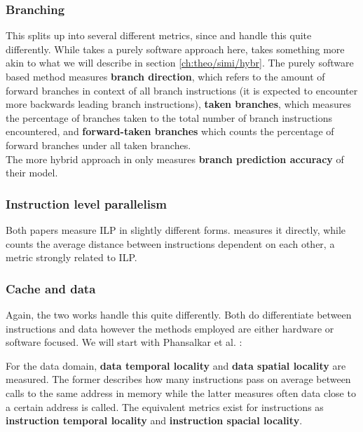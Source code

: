 \documentclass[../bachelor_paper.tex]{subfiles}
\begin{document}
\subsubsection{Branching} 
This splits up into several different metrics, since \cite{phansalkarMeasuringProgramSimilarity2005} and \cite{eeckhoutDesigningComputerArchitecture2003} handle this quite differently. While \cite{phansalkarMeasuringProgramSimilarity2005} takes a purely software approach here, \cite{eeckhoutDesigningComputerArchitecture2003} takes something more akin to what we will describe in section \ref{ch:theo/simi/hybr}. The purely software based method measures \textbf{branch direction}, which refers to the amount of forward branches in context of all branch instructions (it is expected to encounter more backwards leading branch instructions), \textbf{taken branches}, which measures the percentage of branches taken to the total number of branch instructions encountered, and \textbf{forward-taken branches} which counts the percentage of forward branches under all taken branches.\\
The more hybrid approach in \cite{eeckhoutDesigningComputerArchitecture2003} only measures \textbf{branch prediction accuracy} of their model.

\subsubsection{Instruction level parallelism}
Both papers measure \ac{ILP} in slightly different forms. \cite{eeckhoutDesigningComputerArchitecture2003} measures it directly, while \cite{phansalkarMeasuringProgramSimilarity2005} counts the average distance between instructions dependent on each other, a metric strongly related to \ac{ILP}.

\subsubsection{Cache and data}
Again, the two works handle this quite differently. Both do differentiate between instructions and data however the methods employed are either hardware or software focused. We will start with Phansalkar et al. \cite{phansalkarMeasuringProgramSimilarity2005}:

For the data domain, \textbf{data temporal locality} and \textbf{data spatial locality} are measured. The former describes how many instructions pass on average between calls to the same address in memory while the latter measures often data close to a certain address is called. The equivalent metrics exist for instructions as \textbf{instruction temporal locality} and \textbf{instruction spacial locality}.
\end{document}
